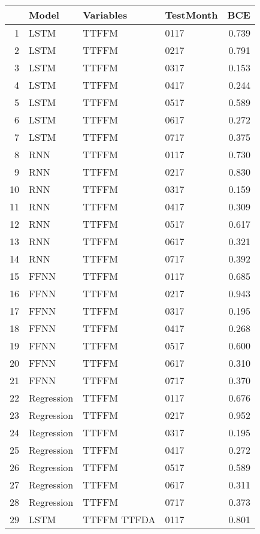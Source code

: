 \begin{table}[ht]
\centering
\begin{tabular}{rlllr}
  \hline
 & Model & Variables & TestMonth & BCE \\ 
  \hline
1 & LSTM & TTFFM  & 0117 & 0.739 \\ 
  2 & LSTM & TTFFM  & 0217 & 0.791 \\ 
  3 & LSTM & TTFFM  & 0317 & 0.153 \\ 
  4 & LSTM & TTFFM  & 0417 & 0.244 \\ 
  5 & LSTM & TTFFM  & 0517 & 0.589 \\ 
  6 & LSTM & TTFFM  & 0617 & 0.272 \\ 
  7 & LSTM & TTFFM  & 0717 & 0.375 \\ 
  8 & RNN & TTFFM  & 0117 & 0.730 \\ 
  9 & RNN & TTFFM  & 0217 & 0.830 \\ 
  10 & RNN & TTFFM  & 0317 & 0.159 \\ 
  11 & RNN & TTFFM  & 0417 & 0.309 \\ 
  12 & RNN & TTFFM  & 0517 & 0.617 \\ 
  13 & RNN & TTFFM  & 0617 & 0.321 \\ 
  14 & RNN & TTFFM  & 0717 & 0.392 \\ 
  15 & FFNN & TTFFM  & 0117 & 0.685 \\ 
  16 & FFNN & TTFFM  & 0217 & 0.943 \\ 
  17 & FFNN & TTFFM  & 0317 & 0.195 \\ 
  18 & FFNN & TTFFM  & 0417 & 0.268 \\ 
  19 & FFNN & TTFFM  & 0517 & 0.600 \\ 
  20 & FFNN & TTFFM  & 0617 & 0.310 \\ 
  21 & FFNN & TTFFM  & 0717 & 0.370 \\ 
  22 & Regression & TTFFM  & 0117 & 0.676 \\ 
  23 & Regression & TTFFM  & 0217 & 0.952 \\ 
  24 & Regression & TTFFM  & 0317 & 0.195 \\ 
  25 & Regression & TTFFM  & 0417 & 0.272 \\ 
  26 & Regression & TTFFM  & 0517 & 0.589 \\ 
  27 & Regression & TTFFM  & 0617 & 0.311 \\ 
  28 & Regression & TTFFM  & 0717 & 0.373 \\ 
  29 & LSTM & TTFFM TTFDA & 0117 & 0.801 \\ 

\end{tabular}
\end{table}
